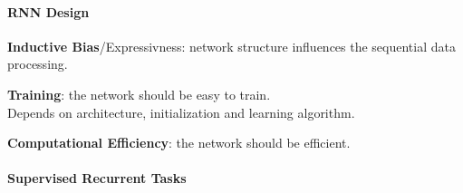\documentclass[10pt]{report}
\begin{document}
\paragraph{RNN Design}\begin{list}{}{}
	\item \textbf{Inductive Bias}/Expressivness: network structure influences the sequential data processing.
	\item \textbf{Training}: the network should be easy to train.\\
	Depends on architecture, initialization and learning algorithm.
	\item \textbf{Computational Efficiency}: the network should be efficient.
\end{list}
\pagebreak
\paragraph{Supervised Recurrent Tasks}
\end{document}
